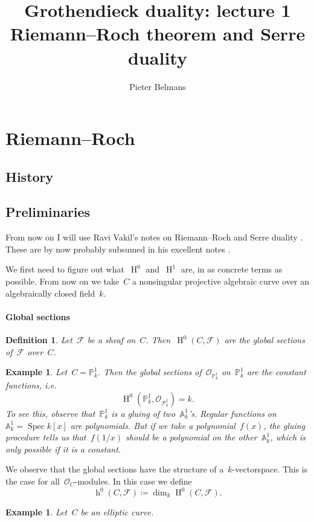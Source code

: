 \documentclass[10pt,a4paper]{article}
\title{Grothendieck duality: lecture 1 \\[.2em] \Large Riemann--Roch theorem and Serre duality}
\author{Pieter Belmans}
\theoremstyle{lecture}
\newtheorem{definition}[theorem]{Definition}
\newtheorem{example}[theorem]{Example}
\newcommand\dash{\nobreakdash-\hspace{0pt}}
\DeclareMathOperator\hh{h}
\DeclareMathOperator\HH{H}
\DeclareMathOperator\Spec{Spec}
\begin{document}
\maketitle

\begin{abstract}
  
\end{abstract}

\tableofcontents

\section{Riemann--Roch}
\label{section:riemann-roch}
\subsection{History}
\label{subsection:riemann-roch-history}

\subsection{Preliminaries}
\label{subsection:preliminaries}
From now on I will use Ravi Vakil's notes on Riemann--Roch and Serre duality \cite{vakil-proof-riemann-roch}. These are by now probably subsumed in his excellent notes \cite{vakil-math216}.

We first need to figure out what~$\HH^0$ and~$\HH^1$ are, in as concrete terms as possible. From now on we take~$C$ a nonsingular projective algebraic curve over an algebraically closed field~$k$.
\paragraph{Global sections}
\begin{definition}
  Let~$\mathcal{F}$ be a sheaf on~$C$. Then~$\HH^0(C,\mathcal{F})$ are the \emph{global sections} of~$\mathcal{F}$ over~$C$.
\end{definition}
\begin{example}
  Let~$C=\mathbb{P}_k^1$. Then the global sections of~$\mathcal{O}_{\mathbb{P}_k^1}$ on~$\mathbb{P}_k^1$ are the constant functions, i.e.
  \begin{equation}
    \HH^0(\mathbb{P}_k^1,\mathcal{O}_{\mathcal{P}_k^1})=k.
  \end{equation}
  To see this, observe that~$\mathbb{P}_k^1$ is a gluing of two~$\mathbb{A}_k^1$'s. Regular functions on~$\mathbb{A}_k^1=\Spec k[x]$ are polynomials. But if we take a polynomial~$f(x)$, the gluing procedure tells us that~$f(1/x)$ should be a polynomial on the other~$\mathbb{A}_k^1$, which is only possible if it is a constant.
\end{example}
We observe that the global sections have the structure of a~$k$\dash vectorspace. This is the case for all~$\mathcal{O}_C$\dash modules. In this case we define
\begin{equation}
  \hh^0(C,\mathcal{F})\coloneqq\dim_k\HH^0(C,\mathcal{F}).
\end{equation}
\begin{example}
  Let~$C$ be an elliptic curve\expand.
\end{example}
\end{document}
